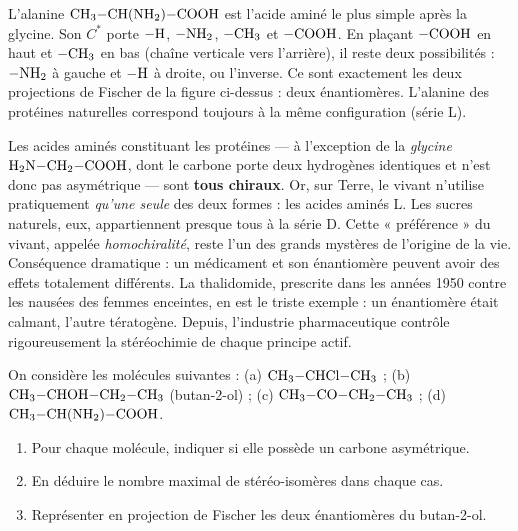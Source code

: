 \documentclass[11pt]{article}
\begin{document}
\begin{exemplebox}
L'alanine $\ce{CH3-CH(NH2)-COOH}$ est l'acide aminé le plus simple après la glycine. Son $C^*$ porte $\ce{-H}$, $\ce{-NH2}$, $\ce{-CH3}$ et $\ce{-COOH}$. En plaçant $\ce{-COOH}$ en haut et $\ce{-CH3}$ en bas (chaîne verticale vers l'arrière), il reste deux possibilités : $\ce{-NH2}$ à gauche et $\ce{-H}$ à droite, ou l'inverse. Ce sont exactement les deux projections de Fischer de la figure ci-dessus : deux énantiomères. L'alanine des protéines naturelles correspond toujours à la même configuration (série L).
\end{exemplebox}

\begin{savaistu}
Les acides aminés constituant les protéines — à l'exception de la \emph{glycine} $\ce{H2N-CH2-COOH}$, dont le carbone porte deux hydrogènes identiques et n'est donc pas asymétrique — sont \textbf{tous chiraux}. Or, sur Terre, le vivant n'utilise pratiquement \emph{qu'une seule} des deux formes : les acides aminés L. Les sucres naturels, eux, appartiennent presque tous à la série D. Cette « préférence » du vivant, appelée \emph{homochiralité}, reste l'un des grands mystères de l'origine de la vie. Conséquence dramatique : un médicament et son énantiomère peuvent avoir des effets totalement différents. La thalidomide, prescrite dans les années 1950 contre les nausées des femmes enceintes, en est le triste exemple : un énantiomère était calmant, l'autre tératogène. Depuis, l'industrie pharmaceutique contrôle rigoureusement la stéréochimie de chaque principe actif.
\end{savaistu}

\begin{exercice}
On considère les molécules suivantes : (a) $\ce{CH3-CHCl-CH3}$ ; (b) $\ce{CH3-CHOH-CH2-CH3}$ (butan-2-ol) ; (c) $\ce{CH3-CO-CH2-CH3}$ ; (d) $\ce{CH3-CH(NH2)-COOH}$.
\begin{enumerate}
\item Pour chaque molécule, indiquer si elle possède un carbone asymétrique.
\item En déduire le nombre maximal de stéréo-isomères dans chaque cas.
\item Représenter en projection de Fischer les deux énantiomères du butan-2-ol.
\end{enumerate}
\end{exercice}
\end{document}
